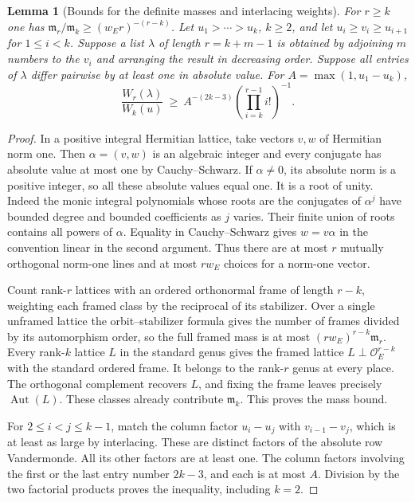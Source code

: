 \documentclass[a4paper,11pt]{article}
\newtheorem{lemma}[proposition]{Lemma}
\theoremstyle{definition}
\theoremstyle{remark}
\numberwithin{equation}{section}
\begin{document}
\begin{lemma}[Bounds for the definite masses and interlacing weights]
\label{lem:mass90}
For \(r\ge k\) one has
\(\mathfrak m_r/\mathfrak m_k\ge (w_E r)^{-(r-k)}\).
Let \(u_1>\cdots>u_k\), \(k\ge2\), and let
\(u_i\ge v_i\ge u_{i+1}\) for \(1\le i<k\). Suppose a list
\(\lambda\) of length \(r=k+m-1\) is obtained by adjoining
\(m\) numbers to the \(v_i\) and arranging the result in
decreasing order. Suppose all entries of \(\lambda\) differ
pairwise by at least one in absolute value. For
\(A=\max(1,u_1-u_k)\),
\[
     \frac{W_r(\lambda)}{W_k(u)}
          \ \ge\ A^{-(2k-3)}\left(\prod_{i=k}^{r-1}i!\right)^{-1}.
\]
\end{lemma}
\begin{proof}
In a positive integral Hermitian lattice, take vectors \(v,w\)
of Hermitian norm one. Then \(\alpha=(v,w)\) is an algebraic
integer and every conjugate has absolute value at most one
by Cauchy--Schwarz. If \(\alpha\ne0\), its absolute norm is
a positive integer, so all these absolute values equal one.
It is a root of unity. Indeed the monic integral polynomials
whose roots are the conjugates of \(\alpha^j\) have bounded
degree and bounded coefficients as \(j\) varies. Their finite
union of roots contains all powers of \(\alpha\). Equality
in Cauchy--Schwarz gives \(w=v\alpha\) in the convention
linear in the second argument. Thus there are at most \(r\)
mutually orthogonal norm-one lines and at most \(rw_E\) choices
for a norm-one vector.

Count rank-\(r\) lattices with an ordered orthonormal frame
of length \(r-k\), weighting each framed class by the reciprocal
of its stabilizer. Over a single unframed lattice the
orbit--stabilizer formula gives the number of frames divided
by its automorphism order, so the full framed mass is at most
\((rw_E)^{r-k}\mathfrak m_r\). Every rank-\(k\) lattice \(L\)
in the standard genus gives the framed lattice
\(L\perp\mathcal O_E^{r-k}\) with the standard ordered frame.
It belongs to the rank-\(r\) genus at every place. The orthogonal
complement recovers \(L\), and fixing the frame leaves precisely
\(\operatorname{Aut}(L)\). These classes already contribute
\(\mathfrak m_k\). This proves the mass bound.

For \(2\le i<j\le k-1\), match the column factor \(u_i-u_j\)
with \(v_{i-1}-v_j\), which is at least as large by interlacing.
These are distinct factors of the absolute row Vandermonde.
All its other factors are at least one. The column factors
involving the first or the last entry number \(2k-3\), and
each is at most \(A\). Division by the two factorial products
proves the inequality, including \(k=2\).
\end{proof}
\end{document}

